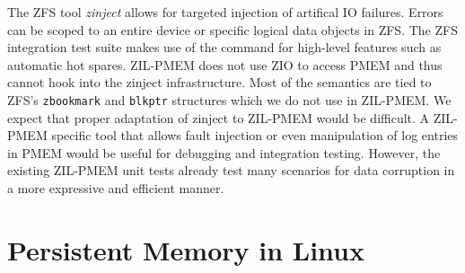\documentclass[12pt,a4paper,twoside]{book}
\begin{document}
The ZFS tool \textit{zinject} allows for targeted injection of artifical IO failures.
Errors can be scoped to an entire device or specific logical data objects in ZFS.
The ZFS integration test suite makes use of the command for high-level features such as automatic hot spares.
ZIL-PMEM does not use ZIO to access PMEM and thus cannot hook into the zinject infrastructure.
Most of the semantics are tied to ZFS’s \lstinline{zbookmark} and \lstinline{blkptr} structures which we do not use in ZIL-PMEM.
We expect that proper adaptation of zinject to ZIL-PMEM would be difficult.
A ZIL-PMEM specific tool that allows fault injection or even manipulation of log entries in PMEM would be useful for debugging and integration testing.
However, the existing ZIL-PMEM unit tests already test many scenarios for data corruption in a more expressive and efficient manner.

\section{Persistent Memory in Linux}

\end{document}
